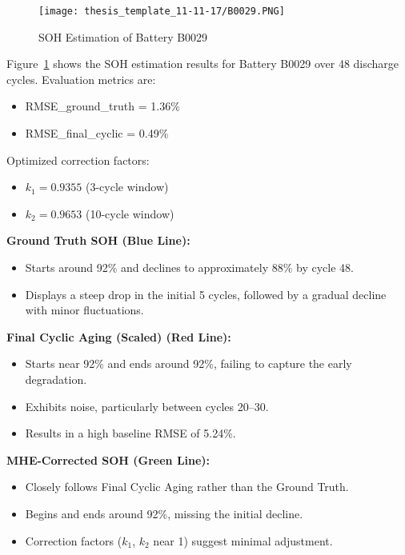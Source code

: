 \begin{figure}
    \centering
    \texttt{[image: thesis\_template\_11-11-17/B0029.PNG]}
    \caption{SOH Estimation of Battery B0029}
    \label{fig:resB0029}
\end{figure}

Figure~\ref{fig:resB0029} shows the SOH estimation results for Battery B0029 over 48 discharge cycles. Evaluation metrics are:
\begin{itemize}
    \item RMSE\_ground\_truth = 1.36\%
    \item RMSE\_final\_cyclic = 0.49\%
\end{itemize}

Optimized correction factors:
\begin{itemize}
    \item $k_1 = 0.9355$ (3-cycle window)
    \item $k_2 = 0.9653$ (10-cycle window)
\end{itemize}

\vspace{0.5em}
\textbf{Ground Truth SOH (Blue Line):}
\begin{itemize}
    \item Starts around 92\% and declines to approximately 88\% by cycle 48.
    \item Displays a steep drop in the initial 5 cycles, followed by a gradual decline with minor fluctuations.
\end{itemize}

\vspace{0.5em}
\textbf{Final Cyclic Aging (Scaled) (Red Line):}
\begin{itemize}
    \item Starts near 92\% and ends around 92\%, failing to capture the early degradation.
    \item Exhibits noise, particularly between cycles 20--30.
    \item Results in a high baseline RMSE of 5.24\%.
\end{itemize}

\vspace{0.5em}
\textbf{MHE-Corrected SOH (Green Line):}
\begin{itemize}
    \item Closely follows Final Cyclic Aging rather than the Ground Truth.
    \item Begins and ends around 92\%, missing the initial decline.
    \item Correction factors ($k_1$, $k_2$ near 1) suggest minimal adjustment.
\end{itemize}

